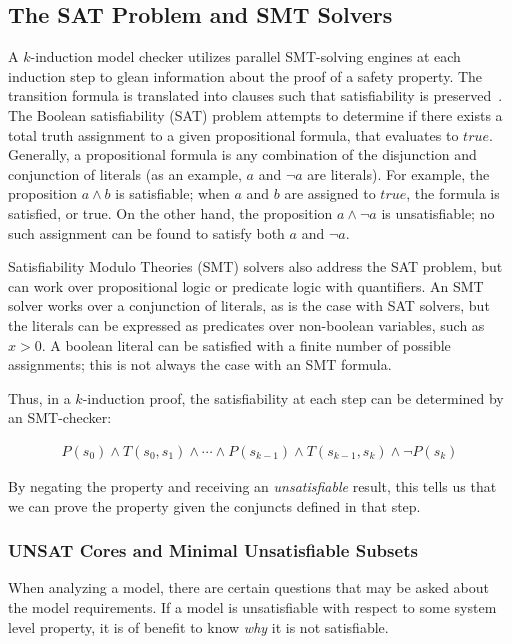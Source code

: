 \subsection{The SAT Problem and SMT Solvers}
\label{sec:satsmt}
A $\mathit{k}$-induction model checker utilizes parallel SMT-solving engines at each induction step to glean information about the proof of a safety property. The transition formula is translated into clauses such that satisfiability is preserved~\cite{een2003temporal}. The Boolean satisfiability (SAT) problem attempts to determine if there exists a total truth assignment to a given propositional formula, that evaluates to $true$. Generally, a propositional formula is any combination of the disjunction and conjunction of literals (as an example, $a$ and $\neg a$ are literals). For example, the proposition $a \land b$ is satisfiable; when $a$ and $b$ are assigned to $true$, the formula is satisfied, or true.  On the other hand, the proposition $a \land \neg a$ is unsatisfiable; no such assignment can be found to satisfy both $a$ and $\neg a$. 

Satisfiability Modulo Theories (SMT) solvers also address the SAT problem, but can work over propositional logic or predicate logic with quantifiers. An SMT solver works over a conjunction of literals, as is the case with SAT solvers, but the literals can be expressed as predicates over non-boolean variables, such as $x > 0$. A boolean literal can be satisfied with a finite number of possible assignments; this is not always the case with an SMT formula.

Thus, in a $\mathit{k}$-induction proof, the satisfiability at each step can be determined by an SMT-checker: 

\begin{gather*}
P(s_0) \land T(s_0, s_1) \land \cdots \land P(s_{k-1}) \land
T(s_{k-1}, s_k) \land \neg P(s_k)
\end{gather*}

By negating the property and receiving an {\em unsatisfiable} result, this tells us that we can prove the property given the conjuncts defined in that step. 


\subsubsection{UNSAT Cores and Minimal Unsatisfiable Subsets}
When analyzing a model, there are certain questions that may be asked about the model requirements. If a model is unsatisfiable with respect to some system level property, it is of benefit to know \emph{why} it is not satisfiable. 

